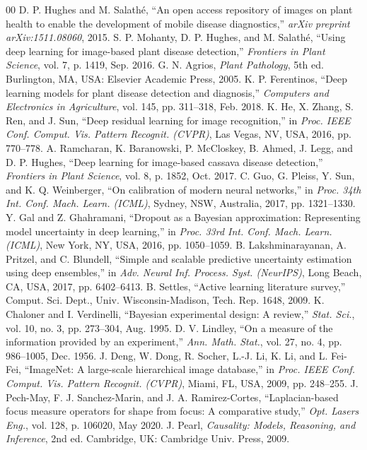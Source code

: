 \documentclass[conference]{IEEEtran}
\begin{document}
\begin{thebibliography}{00}
 D. P. Hughes and M. Salath\'e, ``An open access repository of images on plant health to enable the development of mobile disease diagnostics,'' \textit{arXiv preprint arXiv:1511.08060}, 2015.
 S. P. Mohanty, D. P. Hughes, and M. Salath\'e, ``Using deep learning for image-based plant disease detection,'' \textit{Frontiers in Plant Science}, vol. 7, p. 1419, Sep. 2016.
 G. N. Agrios, \textit{Plant Pathology}, 5th ed. Burlington, MA, USA: Elsevier Academic Press, 2005.
 K. P. Ferentinos, ``Deep learning models for plant disease detection and diagnosis,'' \textit{Computers and Electronics in Agriculture}, vol. 145, pp. 311--318, Feb. 2018.
 K. He, X. Zhang, S. Ren, and J. Sun, ``Deep residual learning for image recognition,'' in \textit{Proc. IEEE Conf. Comput. Vis. Pattern Recognit. (CVPR)}, Las Vegas, NV, USA, 2016, pp. 770--778.
 A. Ramcharan, K. Baranowski, P. McCloskey, B. Ahmed, J. Legg, and D. P. Hughes, ``Deep learning for image-based cassava disease detection,'' \textit{Frontiers in Plant Science}, vol. 8, p. 1852, Oct. 2017.
 C. Guo, G. Pleiss, Y. Sun, and K. Q. Weinberger, ``On calibration of modern neural networks,'' in \textit{Proc. 34th Int. Conf. Mach. Learn. (ICML)}, Sydney, NSW, Australia, 2017, pp. 1321--1330.
 Y. Gal and Z. Ghahramani, ``Dropout as a Bayesian approximation: Representing model uncertainty in deep learning,'' in \textit{Proc. 33rd Int. Conf. Mach. Learn. (ICML)}, New York, NY, USA, 2016, pp. 1050--1059.
 B. Lakshminarayanan, A. Pritzel, and C. Blundell, ``Simple and scalable predictive uncertainty estimation using deep ensembles,'' in \textit{Adv. Neural Inf. Process. Syst. (NeurIPS)}, Long Beach, CA, USA, 2017, pp. 6402--6413.
 B. Settles, ``Active learning literature survey,'' Comput. Sci. Dept., Univ. Wisconsin-Madison, Tech. Rep. 1648, 2009.
 K. Chaloner and I. Verdinelli, ``Bayesian experimental design: A review,'' \textit{Stat. Sci.}, vol. 10, no. 3, pp. 273--304, Aug. 1995.
 D. V. Lindley, ``On a measure of the information provided by an experiment,'' \textit{Ann. Math. Stat.}, vol. 27, no. 4, pp. 986--1005, Dec. 1956.
 J. Deng, W. Dong, R. Socher, L.-J. Li, K. Li, and L. Fei-Fei, ``ImageNet: A large-scale hierarchical image database,'' in \textit{Proc. IEEE Conf. Comput. Vis. Pattern Recognit. (CVPR)}, Miami, FL, USA, 2009, pp. 248--255.
 J. Pech-May, F. J. Sanchez-Marin, and J. A. Ramirez-Cortes, ``Laplacian-based focus measure operators for shape from focus: A comparative study,'' \textit{Opt. Lasers Eng.}, vol. 128, p. 106020, May 2020.
 J. Pearl, \textit{Causality: Models, Reasoning, and Inference}, 2nd ed. Cambridge, UK: Cambridge Univ. Press, 2009.
\end{thebibliography}
\end{document}
